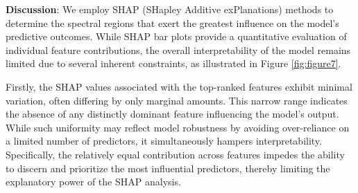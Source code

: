 \documentclass[10pt, a4paper, oneside]{article}
\begin{document}
\begin{table}[!h]
\centering
{}
\caption{Evaluating performance of MLP and KAN with/without Feature Extractor using MSE $(\downarrow)$ and R2-score $(\uparrow)$}\label{tab:table4}
\end{table}

\textbf{Discussion}: We employ SHAP (SHapley Additive exPlanations) \cite{lundberg2017unified} methods to determine the spectral regions that exert the greatest influence on the model’s predictive outcomes. While SHAP bar plots provide a quantitative evaluation of individual feature contributions, the overall interpretability of the model remains limited due to several inherent constraints, as illustrated in Figure \ref{fig:figure7}.

Firstly, the SHAP values associated with the top-ranked features exhibit minimal variation, often differing by only marginal amounts. This narrow range indicates the absence of any distinctly dominant feature influencing the model's output. While such uniformity may reflect model robustness by avoiding over-reliance on a limited number of predictors, it simultaneously hampers interpretability. Specifically, the relatively equal contribution across features impedes the ability to discern and prioritize the most influential predictors, thereby limiting the explanatory power of the SHAP analysis.
\end{document}
